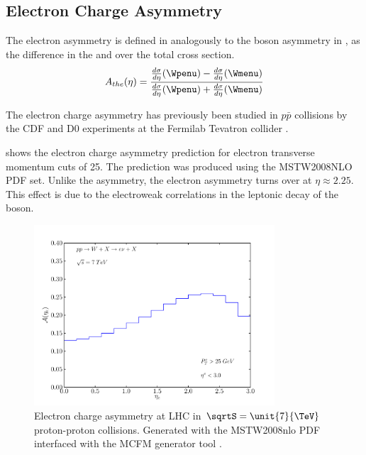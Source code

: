 \subsection{Electron Charge Asymmetry}

The electron asymmetry is defined in  analogously to the
\PW boson asymmetry in , as the difference in the
\HepProcess{\PWplus \to \APelectron} and \HepProcess{\PWminus \to \Pelectron}
over the total \inclusiveWe cross section.
\begin{equation}
A_{the}(\eta)=\frac{  \frac{d\sigma}{d\eta}(\Wpenu) -
\frac{d\sigma}{d\eta}(\Wmenu) }{ \frac{d\sigma}{d\eta}(\Wpenu) +
\frac{d\sigma}{d\eta}(\Wmenu) }
\label{eq:AsymThe}
\end{equation} 

The electron charge asymmetry has previously been studied in $p\bar{p}$
collisions by the CDF and D0 experiments at the Fermilab Tevatron collider
\cite{cdfWAsym,d0WAsym}. 

 shows the electron charge asymmetry prediction for
electron transverse momentum cuts of \unit{25}{\GeV}. The prediction was
produced using the MSTW2008NLO PDF\cite{martin2009parton} set.
Unlike the \PW asymmetry, the electron asymmetry turns over at $\eta\approx
2.25$. This effect is due to the electroweak correlations in the leptonic decay of
the \PW boson.

\begin{figure}[htbp]
  \centering
  \includegraphics[width=0.8\textwidth]{lepton-asym}
  \caption[Electron charge asymmetry at LHC in $\sqrtS=\unit{7}{\TeV}$
proton-proton collisions.] {Electron charge asymmetry at LHC in
$\sqrtS=\unit{7}{\TeV}$ proton-proton collisions.  Generated with the
MSTW2008nlo PDF\cite{martin2009parton} interfaced with the MCFM generator tool
\cite{campbellmcfm}.}
  \label{wbos:asym_simple}
\end{figure}

